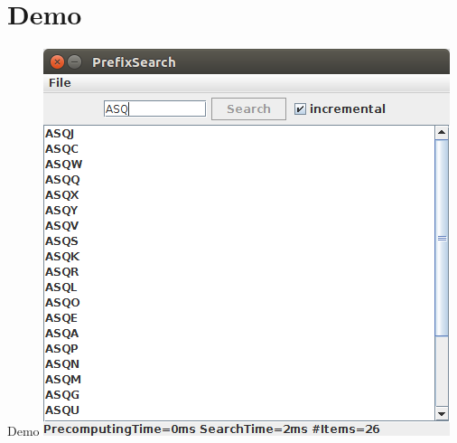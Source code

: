 \documentclass[11pt, xcolor=dvipsnames]{beamer}
\begin{document}
	\section{Demo}
	\begin{frame}{Demo}
		\centering
		\includegraphics[scale=0.4]{pics/screenshot.png}
	\end{frame}
\end{document}
